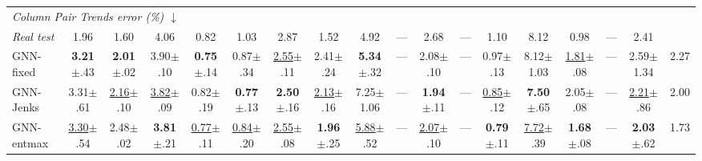 \begin{table}[t]
{\begin{tabular}{lccccccccccccccccc}
\midrule
\multicolumn{18}{l}{\textit{Column Pair Trends error (\%)} $\downarrow$}  \\
\textit{Real test} & 1.96 & 1.60 & 4.06 & 0.82 & 1.03 & 2.87 & 1.52 & 4.92 & --- & 2.68 & --- & 1.10 & 8.12 & 0.98 & --- & 2.41 &  \\
GNN-fixed & \textbf{3.21}{\scriptsize$\pm$.43} & \textbf{2.01}{\scriptsize$\pm$.02} & 3.90{\scriptsize$\pm$.10} & \textbf{0.75}{\scriptsize$\pm$.14} & 0.87{\scriptsize$\pm$.34} & \underline{2.55}{\scriptsize$\pm$.11} & 2.41{\scriptsize$\pm$.24} & \textbf{5.34}{\scriptsize$\pm$.32} & --- & 2.08{\scriptsize$\pm$.10} & --- & 0.97{\scriptsize$\pm$.13} & 8.12{\scriptsize$\pm$1.03} & \underline{1.81}{\scriptsize$\pm$.08} & --- & 2.59{\scriptsize$\pm$1.34} & 2.27 \\
GNN-Jenks & 3.31{\scriptsize$\pm$.61} & \underline{2.16}{\scriptsize$\pm$.10} & \underline{3.82}{\scriptsize$\pm$.09} & 0.82{\scriptsize$\pm$.19} & \textbf{0.77}{\scriptsize$\pm$.13} & \textbf{2.50}{\scriptsize$\pm$.16} & \underline{2.13}{\scriptsize$\pm$.16} & 7.25{\scriptsize$\pm$1.06} & --- & \textbf{1.94}{\scriptsize$\pm$.11} & --- & \underline{0.85}{\scriptsize$\pm$.12} & \textbf{7.50}{\scriptsize$\pm$.65} & 2.05{\scriptsize$\pm$.08} & --- & \underline{2.21}{\scriptsize$\pm$.86} & 2.00 \\
GNN-entmax & \underline{3.30}{\scriptsize$\pm$.54} & 2.48{\scriptsize$\pm$.02} & \textbf{3.81}{\scriptsize$\pm$.21} & \underline{0.77}{\scriptsize$\pm$.11} & \underline{0.84}{\scriptsize$\pm$.20} & \underline{2.55}{\scriptsize$\pm$.08} & \textbf{1.96}{\scriptsize$\pm$.25} & \underline{5.88}{\scriptsize$\pm$.52} & --- & \underline{2.07}{\scriptsize$\pm$.10} & --- & \textbf{0.79}{\scriptsize$\pm$.11} & \underline{7.72}{\scriptsize$\pm$.39} & \textbf{1.68}{\scriptsize$\pm$.08} & --- & \textbf{2.03}{\scriptsize$\pm$.62} & 1.73 \\
\bottomrule
\end{tabular}}
\end{table}
